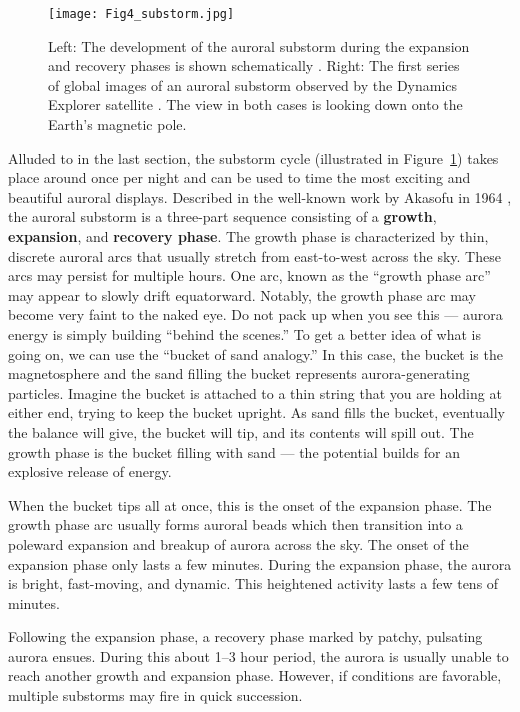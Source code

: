 \documentclass{article}
\renewcommand{\cite}[1]{\parencite{#1}}
\begin{document}
\begin{figure}
  \texttt{[image: Fig4\_substorm.jpg]}
  \caption{Left: The development of the auroral substorm during the expansion and recovery phases is shown schematically \cite{Akasofu1964}. Right: The first series of global images of an auroral substorm observed by the Dynamics Explorer satellite \cite{frank1988}. The view in both cases is looking down onto the Earth's magnetic pole.} 
  \label{fig-substorm}
\end{figure}

Alluded to in the last section, the substorm cycle (illustrated in Figure~\ref{fig-substorm}) takes place around once per night and can be used to time the most exciting and beautiful auroral displays. Described in the well-known work by Akasofu in 1964 \cite{Akasofu1964}, the auroral substorm is a three-part sequence consisting of a {\bf growth}, {\bf expansion}, and {\bf recovery phase}. The growth phase is characterized by thin, discrete auroral arcs that usually stretch from east-to-west across the sky. These arcs may persist for multiple hours. One arc, known as the ``growth phase arc'' may appear to slowly drift equatorward. Notably, the growth phase arc may become very faint to the naked eye. Do not pack up when you see this --- aurora energy is simply building ``behind the scenes.'' To get a better idea of what is going on, we can use the ``bucket of sand analogy.'' In this case, the bucket is the magnetosphere and the sand filling the bucket represents aurora-generating particles. Imagine the bucket is attached to a thin string that you are holding at either end, trying to keep the bucket upright. As sand fills the bucket, eventually the balance will give, the bucket will tip, and its contents will spill out. The growth phase is the bucket filling with sand --- the potential builds for an explosive release of energy. 

When the bucket tips all at once, this is the onset of the expansion phase. The growth phase arc usually forms auroral beads which then transition into a poleward expansion and breakup of aurora across the sky. The onset of the expansion phase only lasts a few minutes. During the expansion phase, the aurora is bright, fast-moving, and dynamic. This heightened activity lasts a few tens of minutes. 

Following the expansion phase, a recovery phase marked by patchy, pulsating aurora ensues. During this about 1--3 hour period, the aurora is usually unable to reach another growth and expansion phase. However, if conditions are favorable, multiple substorms may fire in quick succession.
\end{document}

